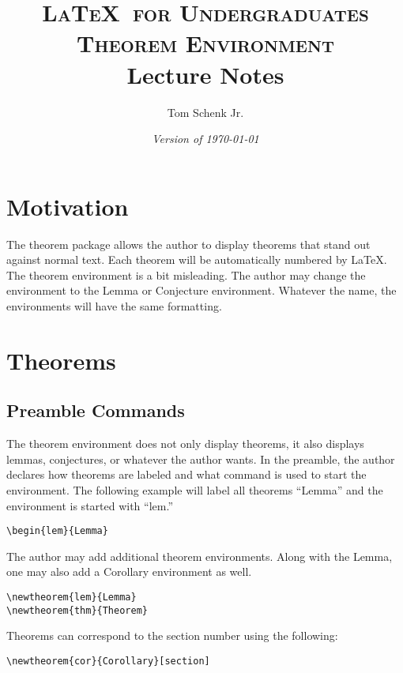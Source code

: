\documentclass{article}
\title{\textsc{\LaTeX\ for Undergraduates\\
			Theorem Environment} \\
			Lecture Notes}
\author{Tom Schenk Jr.}
\date{\textit{Version of \today}}
\newtheorem{lem}{Lemma}
\begin{document}
\maketitle

\section{Motivation}

The theorem package allows the author to display theorems that stand out against normal text. Each theorem will be automatically numbered by \LaTeX. The theorem environment is a bit misleading. The author may change the environment to the Lemma or Conjecture environment. Whatever the name, the environments will have the same formatting.

\section{Theorems}

\subsection{Preamble Commands}

The theorem environment does not only display theorems, it also displays lemmas, conjectures, or whatever the author wants. In the preamble, the author declares how theorems are labeled and what command is used to start the environment. The following example will label all theorems ``Lemma'' and the environment is started with ``lem.''
\begin{center}
\begin{verbatim}
\begin{lem}{Lemma}
\end{verbatim}
\end{center}

The author may add additional theorem environments. Along with the Lemma, one may also add a Corollary environment as well.
\begin{center}
\begin{verbatim}
\newtheorem{lem}{Lemma}
\newtheorem{thm}{Theorem}
\end{verbatim}
\end{center}

Theorems can correspond to the section number using the following:
\begin{center}
\begin{verbatim}
\newtheorem{cor}{Corollary}[section]
\end{verbatim}
\end{center}
\end{document}
